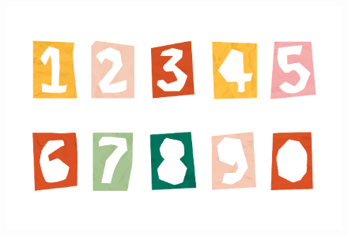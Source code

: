 \begin{figure}[htpb!]
\centering
\includegraphics[width=.7\textwidth]{./media/image16c.png}
\end{figure}




